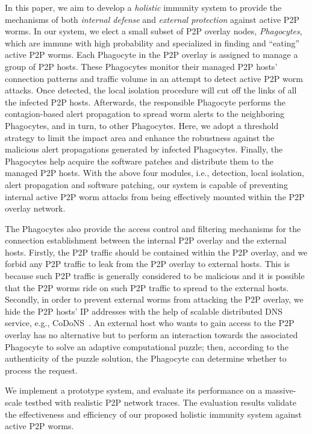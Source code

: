 \documentclass[times,10pt,twocolumn]{article}
\begin{document}
In this paper, we aim to develop a \emph{holistic} immunity system
to provide the mechanisms of both \emph{internal defense} and
\emph{external protection} against active P2P worms. In our system,
we elect a small subset of P2P overlay nodes, \emph{Phagocytes},
which are immune with high probability and specialized in finding
and ``eating'' active P2P worms. Each Phagocyte in the P2P overlay
is assigned to manage a group of P2P hosts. These Phagocytes monitor
their managed P2P hosts' connection patterns and traffic volume in
an attempt to detect active P2P worm attacks. Once detected, the
local isolation procedure will cut off the links of all the infected
P2P hosts. Afterwards, the responsible Phagocyte performs the
contagion-based alert propagation to spread worm alerts to the
neighboring Phagocytes, and in turn, to other Phagocytes. Here, we
adopt a threshold strategy to limit the impact area and enhance the
robustness against the malicious alert propagations generated by
infected Phagocytes. Finally, the Phagocytes help acquire the
software patches and distribute them to the managed P2P hosts. With
the above four modules, i.e., detection, local isolation, alert
propagation and software patching, our system is capable of
preventing internal active P2P worm attacks from being effectively
mounted within the P2P overlay network.



The Phagocytes also provide the access control and filtering
mechanisms for the connection establishment between the internal P2P
overlay and the external hosts. Firstly, the P2P traffic should be
contained within the P2P overlay, and we forbid any P2P traffic to
leak from the P2P overlay to external hosts. This is because such
P2P traffic is generally considered to be malicious and it is
possible that the P2P worms ride on such P2P traffic to spread to
the external hosts. Secondly, in order to prevent external worms
from attacking the P2P overlay, we hide the P2P hosts' IP addresses
with the help of scalable distributed DNS service, e.g.,
CoDoNS~\cite{1015504}. An external host who wants to gain access to
the P2P overlay has no alternative but to perform an interaction
towards the associated Phagocyte to solve an adaptive computational
puzzle; then, according to the authenticity of the puzzle solution,
the Phagocyte can determine whether to process the request.


We implement a prototype system, and evaluate its performance on a
massive-scale testbed with realistic P2P network traces. The
evaluation results validate the effectiveness and efficiency of our
proposed holistic immunity system against active P2P worms.
\end{document}
